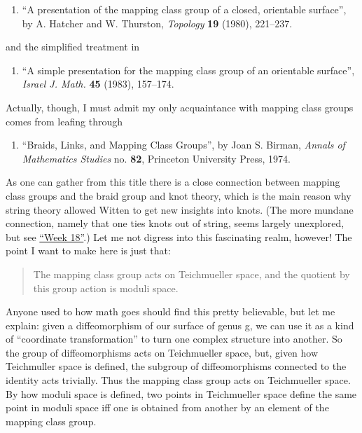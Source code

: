 \documentclass{article}
\def\tightlist{}
\begin{document}
\begin{enumerate}
\def\labelenumi{\arabic{enumi})}
\setcounter{enumi}{3}
\tightlist
\item
  ``A presentation of the mapping class group of a closed, orientable
  surface'', by A. Hatcher and W. Thurston, \emph{Topology} \textbf{19}
  (1980), 221--237.
\end{enumerate}

and the simplified treatment in

\begin{enumerate}
\def\labelenumi{\arabic{enumi})}
\setcounter{enumi}{4}
\tightlist
\item
  ``A simple presentation for the mapping class group of an orientable
  surface'', \emph{Israel J. Math.} \textbf{45} (1983), 157--174.
\end{enumerate}

Actually, though, I must admit my only acquaintance with mapping class
groups comes from leafing through

\begin{enumerate}
\def\labelenumi{\arabic{enumi})}
\setcounter{enumi}{5}
\tightlist
\item
  ``Braids, Links, and Mapping Class Groups'', by Joan S. Birman,
  \emph{Annals of Mathematics Studies} no. \textbf{82}, Princeton
  University Press, 1974.
\end{enumerate}

As one can gather from this title there is a close connection between
mapping class groups and the braid group and knot theory, which is the
main reason why string theory allowed Witten to get new insights into
knots. (The more mundane connection, namely that one ties knots out of
string, seems largely unexplored, but see
\protect\hyperlink{week18}{``Week 18''}.) Let me not digress into this
fascinating realm, however! The point I want to make here is just that:

\begin{quote}
The mapping class group acts on Teichmueller space, and the quotient by
this group action is moduli space.
\end{quote}

Anyone used to how math goes should find this pretty believable, but let
me explain: given a diffeomorphism of our surface of genus g, we can use
it as a kind of ``coordinate transformation'' to turn one complex
structure into another. So the group of diffeomorphisms acts on
Teichmueller space, but, given how Teichmuller space is defined, the
subgroup of diffeomorphisms connected to the identity acts trivially.
Thus the mapping class group acts on Teichmueller space. By how moduli
space is defined, two points in Teichmueller space define the same point
in moduli space iff one is obtained from another by an element of the
mapping class group.
\end{document}
